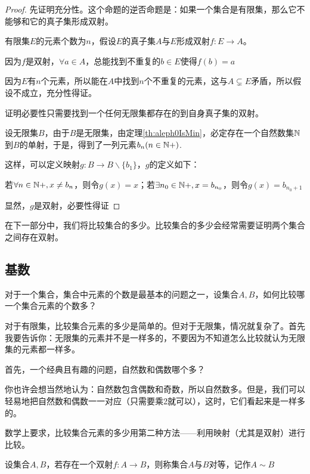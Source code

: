\begin{proof}
    先证明充分性。这个命题的逆否命题是：如果一个集合是有限集，那么它不能够和它的真子集形成双射。

    有限集$E$的元素个数为$n$，假设$E$的真子集$A$与$E$形成双射$f:E\rightarrow A$。

    因为$f$是双射，$\forall a\in A$，总能找到不重复的$b\in E$使得$f(b) = a$

    因为$E$有$n$个元素，所以能在$A$中找到$n$个不重复的元素，这与$A\subsetneq E$矛盾，所以假设不成立，充分性得证。

    证明必要性只需要找到一个任何无限集都存在的到自身真子集的双射。

    设无限集$B$，由于$B$是无限集，由定理\ref{th:aleph0IsMin}，必定存在一个自然数集$\mathbb{N}$到$B$的单射，于是，得到了一列元素${b_n}(n\in \mathbb{N}+)$.

    这样，可以定义映射$g:B\rightarrow B\backslash\{b_1\}$，$g$的定义如下：

    若$\forall n\in \mathbb{N}+,x\neq b_n$，则令$g(x) = x$；若$\exists  n_0\in\mathbb{N}+,x = b_{n_0}$，则令$g(x) = b_{n_0+1}$

    显然，$g$是双射，必要性得证
\end{proof}

在下一部分中，我们将比较集合的多少。比较集合的多少会经常需要证明两个集合之间存在双射。

\subsection{基数}

对于一个集合，集合中元素的个数是最基本的问题之一，设集合$A,B$，如何比较哪一个集合元素的个数多？

对于有限集，比较集合元素的多少是简单的。但对于无限集，情况就复杂了。首先我要告诉你：无限集的元素并不是一样多的，不要因为不知道怎么比较就认为无限集的元素都一样多。

首先，一个经典且有趣的问题，自然数和偶数哪个多？

你也许会想当然地认为：自然数包含偶数和奇数，所以自然数多。但是，我们可以轻易地把自然数和偶数一一对应（只需要乘2就可以），这时，它们看起来是一样多的。

数学上要求，比较集合元素的多少用第二种方法——利用映射（尤其是双射）进行比较。

\begin{definition}
    设集合$A,B$，若存在一个双射$f:A\rightarrow B$，则称集合$A$与$B$对等，记作$A\sim B$
\end{definition}

